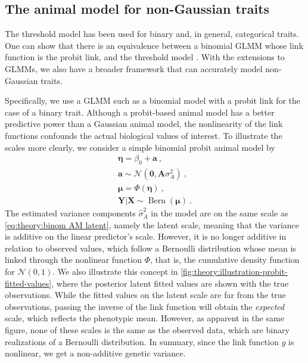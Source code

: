 \subsection{The animal model for non-Gaussian traits}
\label{sec:theory:interpret heritability}
The threshold model has been used for binary and, in general, categorical traits.
One can show that there is an equivalence between a binomial GLMM whose link function is the probit link, and the threshold model \autocite{de2016general}.
With the extensions to GLMMs, we also have a broader framework that can accurately model non-Gaussian traits.

Specifically, we use a GLMM such as a binomial model with a probit link for the case of a binary trait. Although a probit-based animal model has a better predictive power than a Gaussian animal model, the nonlinearity of the link functions confounds the actual biological values of interest. To illustrate the scales more clearly, we consider a simple binomial probit animal model by
\begin{align}
\label{eq:theory:binom AM latent}
    \bm \eta = \beta_0 + \bm a \ ,  \\
    \bm a \sim \mathcal N(\bm 0, \bm A \sigma^2_A) \ ,\\
    \bm \mu = \Phi(\bm \eta) \ ,\\
    \bm Y | \bm X \sim \operatorname{Bern}(\bm \mu) \ . 
\end{align}
The estimated variance components $\hat\sigma^2_A$ in the model are on the same scale as \eqref{eq:theory:binom AM latent}, namely the latent scale, meaning that the variance is additive on the linear predictor's scale. However, it is no longer additive in relation to observed values, which follow a Bernoulli distribution whose mean is linked through the nonlinear function $\Phi$, that is, the cumulative density function for $\mathcal N(0,1)$. We also illustrate this concept in \autoref{fig:theory:illustration-probit-fitted-values}, where the posterior latent fitted values are shown with the true observations. While the fitted values on the latent scale are far from the true observations, passing the inverse of the link function will obtain the \textit{expected} scale, which reflects the phenotypic mean. However, as apparent in the same figure, none of these scales is the same as the observed data, which are binary realizations of a Bernoulli distribution. In summary, since the link function $g$ is nonlinear, we get a non-additive genetic variance.

